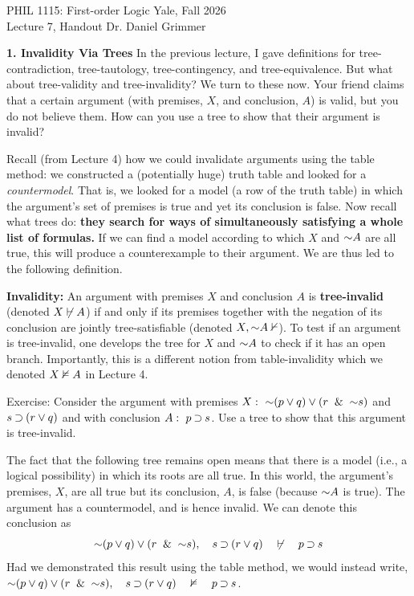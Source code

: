 \documentclass[options]{philosophersimprint}
\begin{document}
PHIL 1115: First-order Logic \hfill Yale, Fall 2026\\
Lecture 7, Handout \hfill Dr. Daniel Grimmer

\textbf{1. Invalidity Via Trees} In the previous lecture, I gave definitions for tree-contradiction, tree-tautology, tree-contingency, and tree-equivalence. But what about tree-validity and tree-invalidity? We turn to these now. Your friend claims that a certain argument (with premises, $X$, and conclusion, $A$) is valid, but you do not believe them. How can you use a tree to show that their argument is invalid?

Recall (from Lecture 4) how we could invalidate arguments using the table method: we constructed a (potentially huge) truth table and looked for a \textit{countermodel}. That is, we looked for a model (a row of the truth table) in which the argument's set of premises is true and yet its conclusion is false. Now recall what trees do: \textbf{they search for ways of simultaneously satisfying a whole list of formulas.} If we can find a model according to which $X$ and $\mathord{\sim} A$ are all true, this will produce a counterexample to their argument. We are thus led to the following definition.

\textbf{Invalidity:} An argument with premises $X$ and conclusion $A$ is \textbf{tree-invalid} (denoted $X \not\vdash A$) if and only if its premises together with the negation of its conclusion are jointly tree-satisfiable (denoted $X,\mathord{\sim} A\nvdash$). To test if an argument is tree-invalid, one develops the tree for $X$ and $\mathord{\sim} A$ to check if it has an open branch. Importantly, this is a different notion from table-invalidity which we denoted $X \nvDash A$ in Lecture 4.

Exercise: Consider the argument with premises $X: \  \mathord{\sim}(p\mathbin{\vee} q) \mathbin{\vee} (r \ \mathbin{\&} \  \mathord{\sim} s)$ and $s \mathbin{\supset} (r \mathbin{\vee} q)$ and with conclusion $A: \ p \mathbin{\supset} s$. Use a tree to show that this argument is tree-invalid.

The fact that the following tree remains open means that there is a model (i.e., a logical possibility) in which its roots are all true. In this world, the argument's premises, $X$, are all true but its conclusion, $A$, is false (because $\mathord{\sim} A$ is true). The argument has a countermodel, and is hence invalid. We can denote this conclusion as
$$\mathord{\sim}(p\mathbin{\vee} q) \mathbin{\vee} (r \ \mathbin{\&} \  \mathord{\sim} s), \quad s \mathbin{\supset} (r \mathbin{\vee} q)\quad \not\vdash \quad p \mathbin{\supset} s$$
Had we demonstrated this result using the table method, we would instead write, $\mathord{\sim}(p\mathbin{\vee} q) \mathbin{\vee} (r \ \mathbin{\&} \  \mathord{\sim} s), \quad s \mathbin{\supset} (r \mathbin{\vee} q)\quad \nvDash \quad p \mathbin{\supset} s$.
\end{document}
